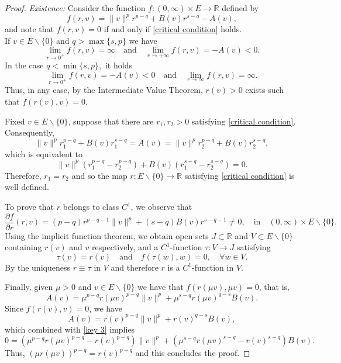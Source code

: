 \documentclass[12pt,reqno]{amsart}
\begin{document}
\begin{proof} {\it Existence:}
Consider the function $f:(0,\infty)\times E\rightarrow \mathds{R}$ defined by 
	\begin{equation*}
		f(r,v)=\|v\|^pr^{p-q}+B(v)r^{s-q}-A(v),
	\end{equation*} 	
and note that $f(r,v)=0$ if and only if \eqref{critical condition} holds. \\
If $v \in E\backslash\{0\}$ and $q>\max\{s,p\}$ we have
 \[
	\lim_{r\rightarrow 0^+}f(r,v)=\infty\quad \text{and}\quad \lim_{r \rightarrow +\infty}f(r,v)=-A(v)<0 .
\] 
In the case  $q<\min\{s,p\},$ it holds
 \[
\lim_{r \rightarrow 0^+}f(r,v)=-A(v)<0\quad \text{and}\quad 	\lim_{r\rightarrow \infty}f(r,v)=\infty.
	\]
Thus, in any case, by the Intermediate Value Theorem, $r(v)>0$ exists such that $f(r(v),v)=0$. 


Fixed $v \in E\backslash\{0\}$,  suppose that there are $r_1,r_2>0$ satisfying  \eqref{critical condition}. Consequently,  
\begin{equation*}
		\|v\|^pr_1^{p-q}+B(v)r_1^{s-q}=A(v)=\|v\|^pr_2^{p-q}+B(v)r_2^{s-q},
	\end{equation*}
which is equivalent to
	\begin{equation*}
		\|v\|^p(r_1^{p-q}-r_2^{p-q})+B(v)(r_1^{s-q}-r_2^{s-q})=0.
	\end{equation*}
Therefore, $r_1=r_2$ and so the map  $r:E\backslash\{0\}\rightarrow \mathds{R}$ satisfying  \eqref{critical condition} is well defined. 

 To prove that $r$ belongs to class $C^1$, we observe that  
	\begin{equation*}
		\frac{\partial f}{\partial r}(r,v)=(p-q)r^{p-q-1}\|v\|^p+(s-q)B(v)r^{s-q-1}\neq 0, \quad \text{in} \quad (0,\infty)\times E\backslash\{0\}.
	\end{equation*}
Using the implicit function theorem, 
 we obtain open sets $J \subset \mathds{R}$  and $V\subset E\backslash\{0\}$ containing $r(v)$ and $v$ respectively, and a $C^1$-function $\tau:V\rightarrow J$ satisfying 
	\[
	\tau(v)=r(v)\quad \text{and}\quad f(\tau(w),w)=0, \quad\forall w \in V.
	\]
By the uniqueness $r\equiv\tau$ in $V$ and therefore $r$ is a $C^1$-function in $V$. 
	
Finally, given $\mu>0$ and $v \in E\backslash\{0\}$ we have that $f(r(\mu v),\mu v)=0$, that is,
	\begin{equation}\label{key 3}
		A(v)=\mu^{p-q}r(\mu v)^{p-q}\|v\|^p+\mu^{s-q}r(\mu v)^{q-s}B(v).
	\end{equation}
Since $f(r(v),v)=0$, we have
$$
		A(v)=r(v)^{p-q}\|v\|^p+r(v)^{q-s}B(v),
  $$
which combined with \eqref{key 3} implies
	\[
	0=(\mu^{p-q}r(\mu v)^{p-q}-r(v)^{p-q})\|v\|^p+(\mu^{s-q}r(\mu v)^{s-q}-r(v)^{s-q})B(v).
	\]
Thus, $(\mu r(\mu v))^{p-q}=r(v)^{p-q}$ and this concludes the proof.  	
\end{proof}
\end{document}
